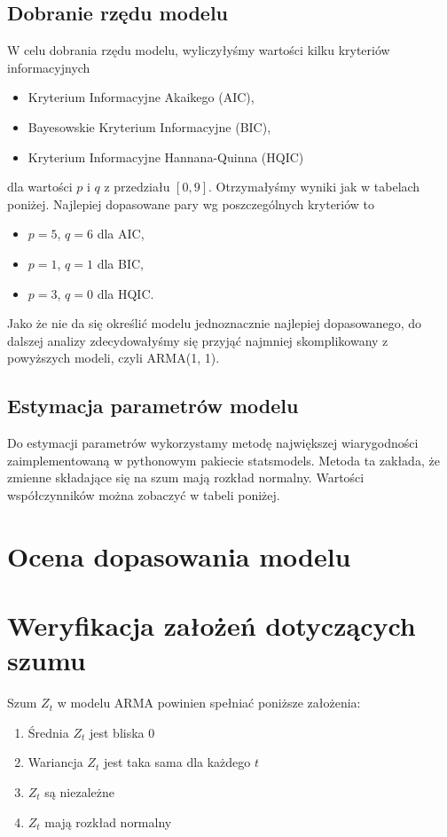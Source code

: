 \documentclass{article}
\theoremstyle{break}
\begin{document}
\subsection{Dobranie rzędu modelu}

W celu dobrania rzędu modelu, wyliczyłyśmy wartości kilku kryteriów informacyjnych
\begin{itemize}
	\item Kryterium Informacyjne Akaikego (AIC),
	\item Bayesowskie Kryterium Informacyjne (BIC),
	\item Kryterium Informacyjne Hannana-Quinna (HQIC)
\end{itemize}
dla wartości $p$ i $q$ z przedziału $[0, 9]$. Otrzymałyśmy wyniki jak w tabelach poniżej. Najlepiej dopasowane pary wg poszczególnych kryteriów to
\begin{itemize}
	\item $p=5$, $q=6$ dla AIC,
	\item $p=1$, $q=1$ dla BIC,
	\item $p=3$, $q=0$ dla HQIC.
\end{itemize}
Jako że nie da się określić modelu jednoznacznie najlepiej dopasowanego, 
do dalszej analizy zdecydowałyśmy się przyjąć najmniej skomplikowany z powyższych modeli, czyli ARMA(1, 1).

\subsection{Estymacja parametrów modelu}

Do estymacji parametrów wykorzystamy metodę największej wiarygodności zaimplementowaną w pythonowym pakiecie statsmodels. Metoda ta zakłada, że zmienne składające się na szum mają rozkład normalny. Wartości współczynników można zobaczyć w tabeli poniżej.

\section{Ocena dopasowania modelu}

\section{Weryfikacja założeń dotyczących szumu}

Szum ${Z_t}$ w modelu ARMA powinien spełniać poniższe założenia:
\begin{enumerate}
	\item Średnia ${Z_t}$ jest bliska 0
	\item Wariancja ${Z_t}$ jest taka sama dla każdego $t$
	\item ${Z_t}$ są niezależne
	\item ${Z_t}$ mają rozkład normalny
\end{enumerate}
\end{document}
